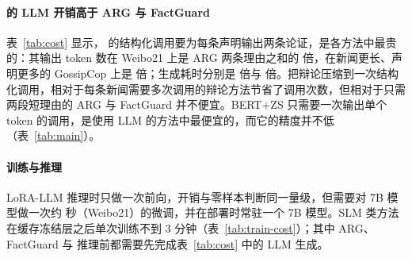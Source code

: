 \begin{table}[!htbp]
\centering\small
\caption{每条新闻的 LLM 开销：平均输入与输出 token 数，以及单张 RTX 3090 上用 vLLM 批量生成时每千条新闻的耗时（秒）。$^\ddagger$ LoRA-LLM 的耗时用 Transformers 逐批前向测得，与 vLLM 不是同一推理实现，仅供量级参考。}\label{tab:cost}
\end{table}

\begin{table}[!htbp]
\centering\small
\caption{可训练参数量与单次训练耗时（单张 RTX 3090；SLM 类方法使用冻结层缓存与混合精度，不含一次性的缓存构建）。}\label{tab:train-cost}
\end{table}

\paragraph{\method{} 的 LLM 开销高于 ARG 与 FactGuard}
表~\ref{tab:cost} 显示，\method{} 的结构化调用要为每条声明输出两条论证，是各方法中最贵的：其输出 token 数在 Weibo21 上是 ARG 两条理由之和的  倍，在新闻更长、声明更多的 GossipCop 上是  倍；生成耗时分别是  倍与  倍。把辩论压缩到一次结构化调用，相对于每条新闻需要多次调用的辩论方法节省了调用次数，但相对于只需两段短理由的 ARG 与 FactGuard 并不便宜。BERT+ZS 只需要一次输出单个 token 的调用，是使用 LLM 的方法中最便宜的，而它的精度并不低（表~\ref{tab:main}）。

\paragraph{训练与推理}
LoRA-LLM 推理时只做一次前向，开销与零样本判断同一量级，但需要对 7B 模型做一次约  秒（Weibo21）的微调，并在部署时常驻一个 7B 模型。SLM 类方法在缓存冻结层之后单次训练不到 3 分钟（表~\ref{tab:train-cost}）；其中 ARG、FactGuard 与 \method{} 推理前都需要先完成表~\ref{tab:cost} 中的 LLM 生成。
